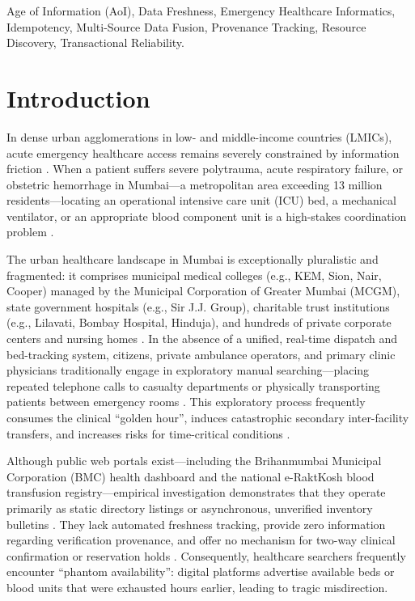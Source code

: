 \documentclass[conference]{IEEEtran}
\begin{document}
\begin{IEEEkeywords}
Age of Information (AoI), Data Freshness, Emergency Healthcare Informatics, Idempotency, Multi-Source Data Fusion, Provenance Tracking, Resource Discovery, Transactional Reliability.
\end{IEEEkeywords}

\section{Introduction}

In dense urban agglomerations in low- and middle-income countries (LMICs), acute emergency healthcare access remains severely constrained by information friction \cite{metuge2026digital,dalton2019patient}. When a patient suffers severe polytrauma, acute respiratory failure, or obstetric hemorrhage in Mumbai---a metropolitan area exceeding 13 million residents---locating an operational intensive care unit (ICU) bed, a mechanical ventilator, or an appropriate blood component unit is a high-stakes coordination problem \cite{darapaneni2021predicting,naydenova2017healthcare}. 

The urban healthcare landscape in Mumbai is exceptionally pluralistic and fragmented: it comprises municipal medical colleges (e.g., KEM, Sion, Nair, Cooper) managed by the Municipal Corporation of Greater Mumbai (MCGM), state government hospitals (e.g., Sir J.J. Group), charitable trust institutions (e.g., Lilavati, Bombay Hospital, Hinduja), and hundreds of private corporate centers and nursing homes \cite{shinde2026insights,mcgm2021covidwarroom,more2009inequalities}. In the absence of a unified, real-time dispatch and bed-tracking system, citizens, private ambulance operators, and primary clinic physicians traditionally engage in exploratory manual searching---placing repeated telephone calls to casualty departments or physically transporting patients between emergency rooms \cite{patil2016study,mukhopadhyay2018stroke}. This exploratory process frequently consumes the clinical ``golden hour'', induces catastrophic secondary inter-facility transfers, and increases risks for time-critical conditions \cite{naydenova2017healthcare,darapaneni2021predicting,skordisworrall2011maternal}.

Although public web portals exist---including the Brihanmumbai Municipal Corporation (BMC) health dashboard and the national e-RaktKosh blood transfusion registry---empirical investigation demonstrates that they operate primarily as static directory listings or asynchronous, unverified inventory bulletins \cite{metuge2026digital,mohfw2022eraktkosh}. They lack automated freshness tracking, provide zero information regarding verification provenance, and offer no mechanism for two-way clinical confirmation or reservation holds \cite{haeder2023state,haeder2024consumer}. Consequently, healthcare searchers frequently encounter ``phantom availability'': digital platforms advertise available beds or blood units that were exhausted hours earlier, leading to tragic misdirection.
\end{document}
